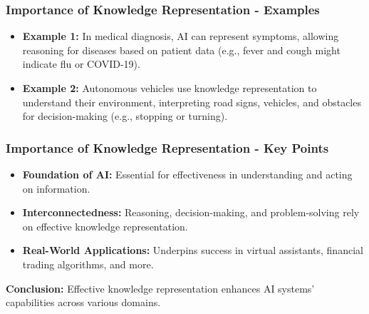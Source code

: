 \documentclass[aspectratio=169]{beamer}
\begin{document}
\begin{frame}[fragile]
    \frametitle{Importance of Knowledge Representation - Examples}
    \begin{itemize}
        \item \textbf{Example 1:} In medical diagnosis, AI can represent symptoms, allowing reasoning for diseases based on patient data (e.g., fever and cough might indicate flu or COVID-19).
        
        \item \textbf{Example 2:} Autonomous vehicles use knowledge representation to understand their environment, interpreting road signs, vehicles, and obstacles for decision-making (e.g., stopping or turning).
    \end{itemize}
\end{frame}

\begin{frame}[fragile]
    \frametitle{Importance of Knowledge Representation - Key Points}
    \begin{itemize}
        \item \textbf{Foundation of AI:} Essential for effectiveness in understanding and acting on information.
        
        \item \textbf{Interconnectedness:} Reasoning, decision-making, and problem-solving rely on effective knowledge representation.
        
        \item \textbf{Real-World Applications:} Underpins success in virtual assistants, financial trading algorithms, and more.
    \end{itemize}
    \vspace{1em}
    \textbf{Conclusion:} Effective knowledge representation enhances AI systems' capabilities across various domains.
\end{frame}
\end{document}
